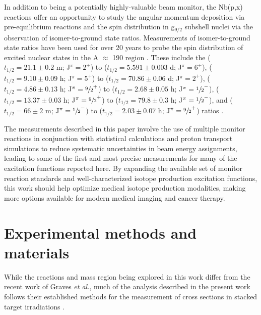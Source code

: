 \documentclass[%
 reprint,
superscriptaddress,
onecolumn,
linenumbers,
notitlepage,
 amsmath,amssymb,
 aps,
prc,
]{revtex4-1}
\newcommand{\etal}{\emph{et al.}}
\begin{document}
  
In addition to being a potentially highly-valuable beam monitor, the Nb(p,x) reactions offer an opportunity to study the angular momentum deposition via pre-equilibrium reactions and the spin distribution in g$_{9/2}$ subshell nuclei via the observation of isomer-to-ground state ratios.  
Measurements of isomer-to-ground state ratios have been used for over 20 years to probe the spin distribution of excited nuclear states in the A $\approx$ 190 region \cite{PhysRevC.73.034613,PhysRevC.45.1171}.
These include the  ($t_{1/2}=21.1\pm0.2$ m; J$^\pi=2^+$) to   ($t_{1/2}=5.591\pm0.003$ d; J$^\pi=6^+$),  ($t_{1/2}=9.10\pm0.09$ h; J$^\pi=5^+$) to   ($t_{1/2}=70.86\pm0.06$ d; J$^\pi=2^+$),   ($t_{1/2}=4.86\pm0.13$ h; J$^\pi=\sfrac{9}{2}^+$) to   ($t_{1/2}=2.68\pm0.05$ h; J$^\pi=\sfrac{1}{2}^-$),   ($t_{1/2}=13.37\pm0.03$ h; J$^\pi=\sfrac{9}{2}^+$) to   ($t_{1/2}=79.8\pm0.3$ h; J$^\pi=\sfrac{1}{2}^-$),  and  ($t_{1/2}=66\pm2$ m; J$^\pi=\sfrac{1}{2}^-$) to   ($t_{1/2}=2.03\pm0.07$ h; J$^\pi=\sfrac{9}{2}^+$)  ratios \cite{Dong2015,Nesaraja2010,Singh2014,Johnson2015,Singh2013}.  
 
 
The measurements described in this paper involve the use of multiple monitor reactions in conjunction with statistical calculations and proton transport simulations to reduce systematic uncertainties in beam energy assignments, leading to some of the first and most precise measurements  for many of the excitation functions reported here. 
By expanding the available set of monitor reaction standards and well-characterized isotope production excitation functions, this work should help optimize medical isotope production modalities, making more options   available for modern medical imaging and cancer therapy.

 
 
 


\section{Experimental methods and materials}\label{sec:experiment}


While the reactions and mass region being explored in this work differ from the recent work of Graves \etal, much of the analysis described in the present work follows their established methods for the measurement of cross sections in stacked target irradiations   \cite{Graves2016}.
\end{document}
